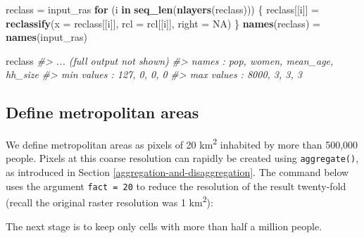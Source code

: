 \documentclass[]{krantz}
\newenvironment{Shaded}{\begin{snugshade}}{\end{snugshade}}
\newcommand{\CommentTok}[1]{\textcolor[rgb]{0.37,0.37,0.37}{\textit{#1}}}
\newcommand{\ControlFlowTok}[1]{\textcolor[rgb]{0.27,0.27,0.27}{\textbf{#1}}}
\newcommand{\DataTypeTok}[1]{\textcolor[rgb]{0.27,0.27,0.27}{#1}}
\newcommand{\DecValTok}[1]{\textcolor[rgb]{0.06,0.06,0.06}{#1}}
\newcommand{\KeywordTok}[1]{\textcolor[rgb]{0.27,0.27,0.27}{\textbf{#1}}}
\newcommand{\NormalTok}[1]{#1}
\newcommand{\OperatorTok}[1]{\textcolor[rgb]{0.43,0.43,0.43}{\textbf{#1}}}
\newcommand{\OtherTok}[1]{\textcolor[rgb]{0.37,0.37,0.37}{#1}}
\newcommand{\StringTok}[1]{\textcolor[rgb]{0.5,0.5,0.5}{#1}}
\begin{document}
\begin{Shaded}
\begin{Highlighting}[]
\NormalTok{reclass =}\StringTok{ }\NormalTok{input_ras}
\ControlFlowTok{for}\NormalTok{ (i }\ControlFlowTok{in} \KeywordTok{seq_len}\NormalTok{(}\KeywordTok{nlayers}\NormalTok{(reclass))) \{}
\NormalTok{  reclass[[i]] =}\StringTok{ }\KeywordTok{reclassify}\NormalTok{(}\DataTypeTok{x =}\NormalTok{ reclass[[i]], }\DataTypeTok{rcl =}\NormalTok{ rcl[[i]], }\DataTypeTok{right =} \OtherTok{NA}\NormalTok{)}
\NormalTok{\}}
\KeywordTok{names}\NormalTok{(reclass) =}\StringTok{ }\KeywordTok{names}\NormalTok{(input_ras)}
\end{Highlighting}
\end{Shaded}

\begin{Shaded}
\begin{Highlighting}[]
\NormalTok{reclass}
\CommentTok{#> ... (full output not shown)}
\CommentTok{#> names       :  pop, women, mean_age, hh_size }
\CommentTok{#> min values  :  127,     0,        0,       0 }
\CommentTok{#> max values  : 8000,     3,        3,       3}
\end{Highlighting}
\end{Shaded}

\hypertarget{define-metropolitan-areas}{%
\subsection{Define metropolitan areas}\label{define-metropolitan-areas}}

We define metropolitan areas as pixels of 20 km\textsuperscript{2} inhabited by more than 500,000 people.
Pixels at this coarse resolution can rapidly be created using \texttt{aggregate()}, as introduced in Section \ref{aggregation-and-disaggregation}.
The command below uses the argument \texttt{fact\ =\ 20} to reduce the resolution of the result twenty-fold (recall the original raster resolution was 1 km\textsuperscript{2}):

\begin{Shaded}
\end{Shaded}

The next stage is to keep only cells with more than half a million people.
\end{document}
